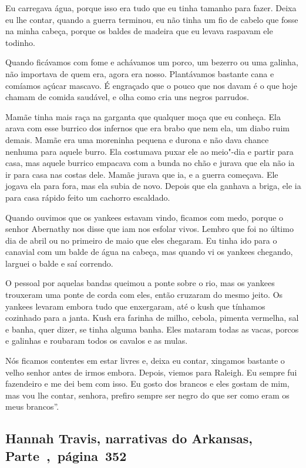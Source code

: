 Eu carregava água, porque isso era tudo que eu tinha tamanho para fazer.
Deixa eu lhe contar, quando a guerra terminou, eu não tinha um fio de
cabelo que fosse na minha cabeça, porque os baldes de madeira que eu
levava raspavam ele todinho.

Quando ficávamos com fome e achávamos um porco, um bezerro ou uma
galinha, não importava de quem era, agora era nosso. Plantávamos
bastante cana e comíamos açúcar mascavo. É engraçado que o pouco que nos
davam é o que hoje chamam de comida saudável, e olha como cria uns
negros parrudos.

Mamãe tinha mais raça na garganta que qualquer moça que eu conheça. Ela
arava com esse burrico dos infernos que era brabo que nem ela, um diabo
ruim demais. Mamãe era uma moreninha pequena e durona e não dava chance
nenhuma para aquele burro. Ela costumava puxar ele ao meio"-dia e partir
para casa, mas aquele burrico empacava com a bunda no chão e jurava que
ela não ia ir para casa nas costas dele. Mamãe jurava que ia, e a guerra
começava. Ele jogava ela para fora, mas ela subia de novo. Depois que
ela ganhava a briga, ele ia para casa rápido feito um cachorro
escaldado.

Quando ouvimos que os yankees estavam vindo, ficamos com medo, porque o
senhor Abernathy nos disse que iam nos esfolar vivos. Lembro que foi no
último dia de abril ou no primeiro de maio que eles chegaram. Eu tinha
ido para o canavial com um balde de água na cabeça, mas quando vi os
yankees chegando, larguei o balde e saí correndo.

O pessoal por aquelas bandas queimou a ponte sobre o rio, mas os yankees
trouxeram uma ponte de corda com eles, então cruzaram do mesmo jeito. Os
yankees levaram embora tudo que enxergaram, até o kush que tínhamos
cozinhado para a janta. Kush era farinha de milho, cebola, pimenta
vermelha, sal e banha, quer dizer, se tinha alguma banha. Eles mataram
todas as vacas, porcos e galinhas e roubaram todos os cavalos e as
mulas.

Nós ficamos contentes em estar livres e, deixa eu contar, xingamos
bastante o velho senhor antes de irmos embora. Depois, viemos para
Raleigh. Eu sempre fui fazendeiro e me dei bem com isso. Eu gosto dos
brancos e eles gostam de mim, mas vou lhe contar, senhora, prefiro
sempre ser negro do que ser como eram os meus brancos''.

\subsection{Hannah Travis, narrativas do Arkansas, Parte~,~página~352}
\label{ref263}

